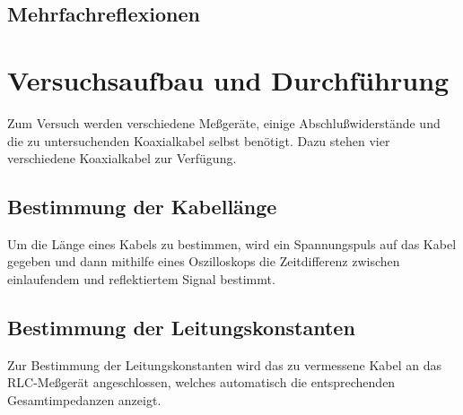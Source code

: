 \subsection{Mehrfachreflexionen}

\section{Versuchsaufbau und Durchführung}

Zum Versuch werden verschiedene Meßgeräte, einige Abschlußwiderstände
und die zu untersuchenden Koaxialkabel selbst benötigt.  Dazu stehen vier
verschiedene Koaxialkabel zur Verfügung.

\subsection{Bestimmung der Kabellänge}

Um die Länge eines Kabels zu bestimmen, wird ein Spannungspuls auf das
Kabel gegeben und dann mithilfe eines Oszilloskops die Zeitdifferenz
zwischen einlaufendem und reflektiertem Signal bestimmt.

\subsection{Bestimmung der Leitungskonstanten}

Zur Bestimmung der Leitungskonstanten wird das zu vermessene Kabel an
das RLC-Meßgerät angeschlossen, welches automatisch die entsprechenden
Gesamtimpedanzen anzeigt.


